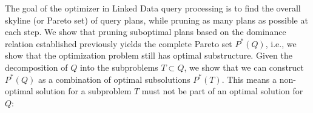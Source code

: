 The goal of the optimizer in Linked Data query processing 
is to find the overall skyline (or Pareto set) of query plans, while
pruning as many plans as possible at each step. We show that pruning suboptimal plans based on the dominance relation established previously yields the complete Pareto set $P^*(Q)$, i.e., we show that the optimization
problem still has optimal substructure.
Given the decomposition of $Q$ into the subproblems $T \subset Q$, we show that we can construct $P^*(Q)$ as a combination of optimal subsolutions $P^*(T)$.  This means a
non-optimal solution for a subproblem $T$ must not be part of an optimal
solution for $Q$:





